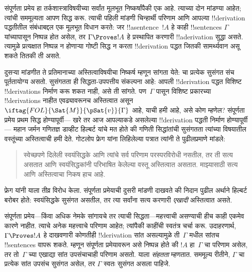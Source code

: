 \documentclass[../../../include/open-logic-section]{subfiles}
\begin{document}
      {}
      {}


संपूर्णता प्रमेय हा तर्कशास्त्राविषयीच्या सर्वांत मूलभूत निष्कर्षांपैकी एक
आहे. त्याच्या दोन मांडण्या आहेत; त्यांची सममूल्यता आपण सिद्ध करू. त्याची
पहिली मांडणी चिन्हार्थी परिणाम आणि आपल्या !!{derivation} पद्धतीतील संबंधाबद्दल
एक मूलभूत विधान करते: जर !!a{sentence}~$!A$ हे काही !!{sentence}s
$\Gamma$ यांच्यापासून निष्पन्न होत असेल, तर $\Gamma \Proves !A$ हे
प्रस्थापित करणारी !!a{derivation} सुद्धा असते. त्यामुळे प्रत्यक्षात निष्पन्न
न होणाऱ्या गोष्टी सिद्ध न करता !!{derivation} पद्धत जितकी सामर्थ्यवान असू
शकते तितकी ती असते.

दुसऱ्या मांडणीत ते प्रतिमानाच्या अस्तित्वाविषयीचा निष्कर्ष म्हणून सांगता येते:
चा प्रत्येक सुसंगत संच पूर्ततायोग्य असतो. सुसंगतता ही
सिद्धता-उपपत्तीय संकल्पना आहे: आपली !!{derivation} पद्धत विशिष्ट
!!{derivation}s निर्माण करू शकत नाही, असे ती सांगते. पण~$\Gamma$ पासून
विशिष्ट प्रकारच्या !!{derivation}s नाहीत एवढ्यावरूनच
अस्तित्वात असून $\iftag{FOL}{\Sat{M}}{\pSat{v}}{\Gamma}$ आहे, याची हमी
आहे, असे कोण म्हणेल? संपूर्णता प्रमेय प्रथम सिद्ध होण्यापूर्वी---
खरे तर आज आपल्याकडे असलेल्या !!{derivation} पद्धती निर्माण होण्यापूर्वी---
महान जर्मन गणितज्ञ डाव्हीट हिल्बर्ट यांचे मत होते की गणिती सिद्धांतांची
सुसंगतता त्यांच्या विषयातील वस्तूंच्या अस्तित्वाची हमी देते. गोटलोप फ्रेग
यांना लिहिलेल्या पत्रात त्यांनी ते पुढीलप्रमाणे मांडले:
\begin{quote}
  स्वेच्छपणे दिलेली स्वयंसिद्धके आणि त्यांचे सर्व परिणाम परस्परविरोधी नसतील,
  तर ती सत्य असतात आणि स्वयंसिद्धकांनी परिभाषित केलेल्या वस्तू अस्तित्वात
  असतात. माझ्यासाठी सत्य आणि अस्तित्वाचा निकष हाच आहे.
\end{quote}
फ्रेग यांनी याला तीव्र विरोध केला. संपूर्णता प्रमेयाची दुसरी मांडणी दाखवते
की निदान पुढील अर्थाने हिल्बर्ट बरोबर होते: स्वयंसिद्धके सुसंगत असतील, तर
त्या सर्वांना सत्य करणारी \emph{एखादी}
 अस्तित्वात असते.

संपूर्णता प्रमेय---किंवा अधिक नेमके सांगायचे तर त्याची सिद्धता---महत्त्वाची
असण्याची हीच काही एकमेव कारणे नाहीत. त्याचे अनेक महत्त्वाचे परिणाम आहेत;
त्यांपैकी काहींची स्वतंत्र चर्चा करू. उदाहरणार्थ, $\Gamma \Proves !A$ हे
दाखवणारी कोणतीही !!{derivation} सांत असल्यामुळे ती~$\Gamma$ मधील सांतच
!!{sentence}s वापरू शकते. म्हणून संपूर्णता प्रमेयावरून असे निष्पन्न होते की
$!A$ हा~$\Gamma$ चा परिणाम असेल, तर तो~$\Gamma$ च्या एखाद्या सांत उपसंचाचाही
परिणाम असतो. याला \emph{संहतता} म्हणतात. सममूल्य रीतीने, $\Gamma$ चा प्रत्येक
सांत उपसंच सुसंगत असेल, तर $\Gamma$ स्वतः सुसंगत असला पाहिजे.
\end{document}
